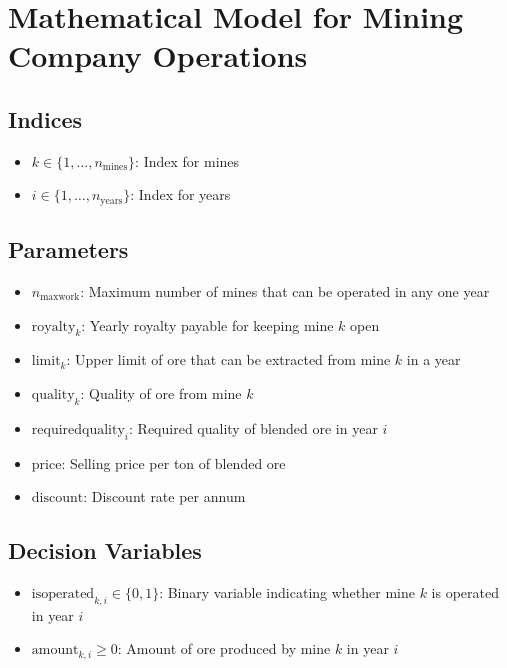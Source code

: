 \documentclass{article}
\begin{document}
\section*{Mathematical Model for Mining Company Operations}

\subsection*{Indices}
\begin{itemize}
    \item \( k \in \{1, \ldots, n_{\text{mines}}\} \): Index for mines
    \item \( i \in \{1, \ldots, n_{\text{years}}\} \): Index for years
\end{itemize}

\subsection*{Parameters}
\begin{itemize}
    \item \( n_{\text{maxwork}} \): Maximum number of mines that can be operated in any one year
    \item \( \text{royalty}_{k} \): Yearly royalty payable for keeping mine \( k \) open
    \item \( \text{limit}_{k} \): Upper limit of ore that can be extracted from mine \( k \) in a year
    \item \( \text{quality}_{k} \): Quality of ore from mine \( k \)
    \item \( \text{requiredquality}_{i} \): Required quality of blended ore in year \( i \)
    \item \( \text{price} \): Selling price per ton of blended ore
    \item \( \text{discount} \): Discount rate per annum
\end{itemize}

\subsection*{Decision Variables}
\begin{itemize}
    \item \( \text{isoperated}_{k,i} \in \{0, 1\} \): Binary variable indicating whether mine \( k \) is operated in year \( i \)
    \item \( \text{amount}_{k,i} \geq 0 \): Amount of ore produced by mine \( k \) in year \( i \)
\end{itemize}
\end{document}
